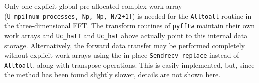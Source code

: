 \documentclass[final,1p,times]{elsarticle}
\newcommand{\inpyth}{\lstinline[style=inlinestyle]} %[]%
\begin{document}
Only one explicit global pre-allocated complex work array (\inpyth{U_mpi[num_processes, Np, Np, N/2+1]}) is needed for the \inpyth{Alltoall} routine in the three-dimensional FFT. The transform routines of \inpyth{pyfftw} maintain their own work arrays and \inpyth{Uc_hatT} and \inpyth{Uc_hat} above actually point to this internal data storage. Alternatively, the forward data transfer may be
performed completely without explicit work arrays using the in-place \inpyth{Sendrecv_replace} instead of
\inpyth{Alltoall}, along with transpose operations. This is easily implemented, but, since the method has been found slightly slower, details are not shown here.

\begin{figure}[t!]
\end{figure}
\end{document}
